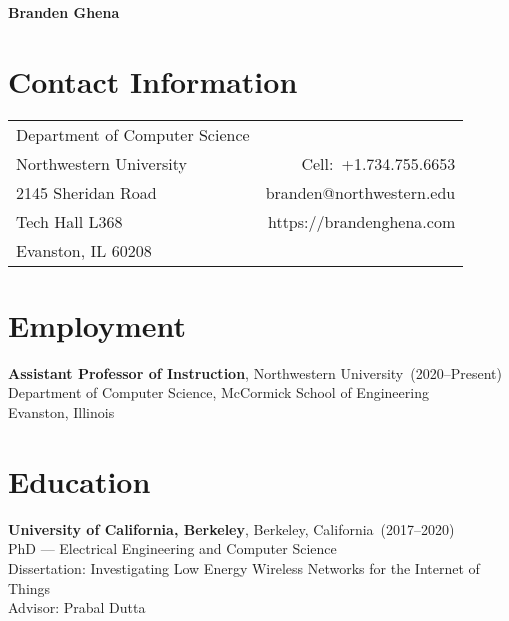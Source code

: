 \documentclass{article}
\begin{document}

\nocite{*}

\begin{center}
    \Huge{\bf{Branden Ghena}} \\
\end{center}

\section*{Contact Information}

\begin{table}[H]
\centering
\vspace*{-16pt}
\begin{tabularx}{\linewidth}{@{} X r @{}}
    {Department of Computer Science}     & {} \\
    {Northwestern University}   & {Cell:~+1.734.755.6653} \\
    {2145 Sheridan Road} & {branden@northwestern.edu} \\
    {Tech Hall L368} & {https://brandenghena.com} \\
    {Evanston, IL 60208} & {} \\
\end{tabularx}
\end{table}

\section*{Employment}
\vspace{-6pt}

{\bf Assistant Professor of Instruction}, Northwestern University~(2020--Present) \\
Department of Computer Science, McCormick School of Engineering \\
Evanston, Illinois


\section*{Education}
\vspace{-6pt}

{\bf University of California, Berkeley}, Berkeley, California~(2017--2020) \\
PhD --- Electrical Engineering and Computer Science \\
Dissertation: Investigating Low Energy Wireless Networks for the Internet of Things \\
Advisor: Prabal Dutta
\end{document}
